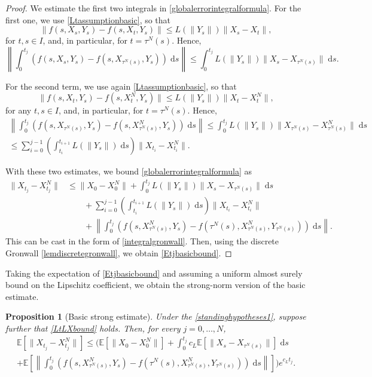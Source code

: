 \documentclass[reqno,12pt]{amsart}
\theoremstyle{plain} %
\newtheorem{proposition}{Proposition}[section]
\theoremstyle{definition} %
\begin{document}
\begin{proof}
    We estimate the first two integrals in \eqref{globalerrorintegralformula}. For the first one, we use \eqref{Ltassumptionbasic}, so that
    $$
        \|f(s, X_s, Y_s) - f(s, X_t, Y_s)\| \leq L(\|Y_s\|) \|X_s - X_t\|,
    $$
    for $t, s \in I$, and, in particular, for $t = \tau^N(s)$. Hence,
    $$
        \left\|\int_0^{t_j} \left( f(s, X_s, Y_s) - f(s, X_{\tau^N(s)}, Y_s) \right)\;\mathrm{d}s \right\| \leq \int_0^{t_j} L(\|Y_s\|) \|X_s - X_{\tau^N(s)}\| \;\mathrm{d}s.
    $$
    
    For the second term, we use again \eqref{Ltassumptionbasic}, so that
    $$
        \|f(s, X_t, Y_s) - f(s, X_t^N, Y_s)\| \leq L(\|Y_s\|) \|X_t - X_t^N\|,
    $$
    for any $t, s \in I$, and, in particular, for $t = \tau^N(s)$. Hence,
    \begin{multline*}
        \left\|\int_0^{t_j} \left( f(s, X_{\tau^N(s)}, Y_s) - f(s, X_{\tau^N(s)}^N, Y_s) \right)\;\mathrm{d}s \right\| \leq \int_0^{t_j} L(\|Y_s\|) \|X_{\tau^N(s)} - X_{\tau^N(s)}^N\| \;\mathrm{d}s \\
        \leq \sum_{i=0}^{j-1} \left(\int_{t_i}^{t_{i+1}}L(\|Y_s\|)\;\mathrm{d}s \right) \|X_{t_i} - X_{t_i}^N\|.
    \end{multline*}
    
    With these two estimates, we bound \eqref{globalerrorintegralformula} as
    \begin{align*}
        \|X_{t_j} - X_{t_j}^N\| & \leq \|X_0 - X_0^N\| + \int_0^{t_j} L(\|Y_s\|) \|X_s - X_{\tau^N(s)}\| \;\mathrm{d}s \\
        & \qquad + \sum_{i=0}^{j-1} \left(\int_{t_i}^{t_{i+1}}L(\|Y_s\|)\;\mathrm{d}s \right) \|X_{t_i} - X_{t_i}^N\| \\
        & \qquad + \left\|\int_0^{t_j} \left( f(s, X_{\tau^N(s)}^N, Y_s) - f(\tau^N(s), X_{\tau^N(s)}^N, Y_{\tau^N(s)}) \right)\;\mathrm{d}s\right\|.
    \end{align*}
    This can be cast in the form of \eqref{integralgronwall}. Then, using the discrete Gronwall \cref{lemdiscretegronwall}, we obtain \eqref{Etjbasicbound}.
\end{proof}

Taking the expectation of \eqref{Etjbasicbound} and assuming a uniform almost surely bound on the Lipschitz coefficient, we obtain the strong-norm version of the basic estimate.
\begin{proposition}[Basic strong estimate]
    \label{propbasicstrongestimate}
    Under the \cref{standinghypotheses1}, suppose further that \eqref{LtLXbound} holds. Then, for every $j = 0, \ldots, N$,
    \begin{multline}
        \label{expectedestimateglobalerrorintegral}
        \mathbb{E}\left[\|X_{t_j} - X_{t_j}^N\|\right] \leq \Bigg( \mathbb{E}\left[\|X_0 - X_0^N\|\right] + \int_0^{t_j} c_L \mathbb{E}\left[\|X_s - X_{\tau^N(s)}\|\right] \;\mathrm{d}s \\
        + \mathbb{E}\left[\left\|\int_0^{t_j} \left( f(s, X_{\tau^N(s)}^N, Y_s) - f(\tau^N(s), X_{\tau^N(s)}^N, Y_{\tau^N(s)}) \right)\;\mathrm{d}s\right\|\right]\Bigg) e^{c_L t_j}.
    \end{multline}
\end{proposition}
\end{document}
